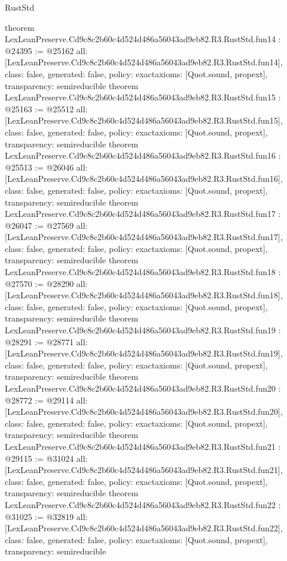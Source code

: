 \begin{lexlean}{RustStd}
\begin{coremodule}
{}
theorem LexLeanPreserve.Cd9c8c2b60c4d524d486a56043ad9eb82.R3.RustStd.fun14 : @24395 := @25162 {
  all: [LexLeanPreserve.Cd9c8c2b60c4d524d486a56043ad9eb82.R3.RustStd.fun14],
  class: false,
  generated: false,
  policy: exact{axioms: [Quot.sound, propext]},
  transparency: semireducible
}
theorem LexLeanPreserve.Cd9c8c2b60c4d524d486a56043ad9eb82.R3.RustStd.fun15 : @25163 := @25512 {
  all: [LexLeanPreserve.Cd9c8c2b60c4d524d486a56043ad9eb82.R3.RustStd.fun15],
  class: false,
  generated: false,
  policy: exact{axioms: [Quot.sound, propext]},
  transparency: semireducible
}
theorem LexLeanPreserve.Cd9c8c2b60c4d524d486a56043ad9eb82.R3.RustStd.fun16 : @25513 := @26046 {
  all: [LexLeanPreserve.Cd9c8c2b60c4d524d486a56043ad9eb82.R3.RustStd.fun16],
  class: false,
  generated: false,
  policy: exact{axioms: [Quot.sound, propext]},
  transparency: semireducible
}
theorem LexLeanPreserve.Cd9c8c2b60c4d524d486a56043ad9eb82.R3.RustStd.fun17 : @26047 := @27569 {
  all: [LexLeanPreserve.Cd9c8c2b60c4d524d486a56043ad9eb82.R3.RustStd.fun17],
  class: false,
  generated: false,
  policy: exact{axioms: [Quot.sound, propext]},
  transparency: semireducible
}
theorem LexLeanPreserve.Cd9c8c2b60c4d524d486a56043ad9eb82.R3.RustStd.fun18 : @27570 := @28290 {
  all: [LexLeanPreserve.Cd9c8c2b60c4d524d486a56043ad9eb82.R3.RustStd.fun18],
  class: false,
  generated: false,
  policy: exact{axioms: [Quot.sound, propext]},
  transparency: semireducible
}
theorem LexLeanPreserve.Cd9c8c2b60c4d524d486a56043ad9eb82.R3.RustStd.fun19 : @28291 := @28771 {
  all: [LexLeanPreserve.Cd9c8c2b60c4d524d486a56043ad9eb82.R3.RustStd.fun19],
  class: false,
  generated: false,
  policy: exact{axioms: [Quot.sound, propext]},
  transparency: semireducible
}
theorem LexLeanPreserve.Cd9c8c2b60c4d524d486a56043ad9eb82.R3.RustStd.fun20 : @28772 := @29114 {
  all: [LexLeanPreserve.Cd9c8c2b60c4d524d486a56043ad9eb82.R3.RustStd.fun20],
  class: false,
  generated: false,
  policy: exact{axioms: [Quot.sound, propext]},
  transparency: semireducible
}
theorem LexLeanPreserve.Cd9c8c2b60c4d524d486a56043ad9eb82.R3.RustStd.fun21 : @29115 := @31024 {
  all: [LexLeanPreserve.Cd9c8c2b60c4d524d486a56043ad9eb82.R3.RustStd.fun21],
  class: false,
  generated: false,
  policy: exact{axioms: [Quot.sound, propext]},
  transparency: semireducible
}
theorem LexLeanPreserve.Cd9c8c2b60c4d524d486a56043ad9eb82.R3.RustStd.fun22 : @31025 := @32819 {
  all: [LexLeanPreserve.Cd9c8c2b60c4d524d486a56043ad9eb82.R3.RustStd.fun22],
  class: false,
  generated: false,
  policy: exact{axioms: [Quot.sound, propext]},
  transparency: semireducible
}
\end{coremodule}
\end{lexlean}
